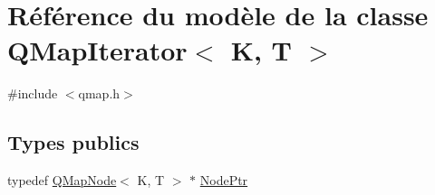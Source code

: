 \hypertarget{class_q_map_iterator}{}\section{Référence du modèle de la classe Q\+Map\+Iterator$<$ K, T $>$}
\label{class_q_map_iterator}


{\ttfamily \#include $<$qmap.\+h$>$}

\subsection*{Types publics}
\begin{DoxyCompactItemize}
\item 
typedef \hyperlink{struct_q_map_node}{Q\+Map\+Node}$<$ K, T $>$ $\ast$ \hyperlink{class_q_map_iterator_a5c98753ea9eaa24ef743577602acb90b}{Node\+Ptr}
\end{DoxyCompactItemize}
